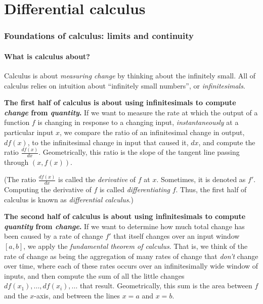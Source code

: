 \part*{Differential calculus}

\section*{Foundations of calculus: limits and continuity}

\subsection*{What is calculus about?}

Calculus is about \textit{measuring change} by thinking about the infinitely small. All of calculus relies on intuition about ``infinitely small numbers'', or \textit{infinitesimals}.

\textbf{The first half of calculus is about using infinitesimals to compute \textit{change} from \textit{quantity}.} If we want to measure the rate at which the output of a function $f$ is changing in response to a changing input, \textit{instantaneously} at a particular input $x$, we compare the ratio of an infinitesimal change in output, $df(x)$, to the infinitesimal change in input that caused it, $dx$, and compute the ratio $\frac{df(x)}{dx}$. Geometrically, this ratio is the slope of the tangent line passing through $(x, f(x))$.

(The ratio $\frac{df(x)}{dx}$ is called the \textit{derivative} of $f$ at $x$. Sometimes, it is denoted as $f'$. Computing the derivative of $f$ is called \textit{differentiating} $f$. Thus, the first half of calculus is known as \textit{differential calculus}.)

\textbf{The second half of calculus is about using infinitesimals to compute \textit{quantity} from \textit{change}.} If we want to determine how much total change has been caused by a rate of change $f'$ that itself changes over an input window $[a, b]$, we apply the \textit{fundamental theorem of calculus}. That is, we think of the rate of change as being the aggregation of many rates of change that \textit{don't} change over time, where each of these rates occurs over an infinitesimally wide window of inputs, and then compute the sum of all the little changes $df(x_1), ..., df(x_i), ...$ that result. Geometrically, this sum is the area between $f$ and the $x$-axis, and between the lines $x = a$ and $x = b$.


